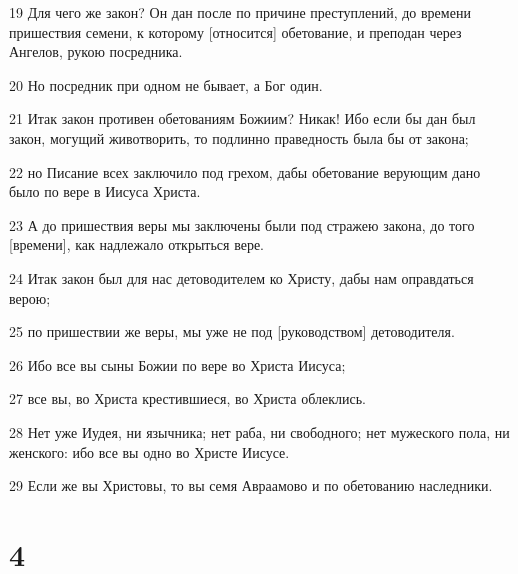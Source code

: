 \par 19 Для чего же закон? Он дан после по причине преступлений, до времени пришествия семени, к которому [относится] обетование, и преподан через Ангелов, рукою посредника.
\par 20 Но посредник при одном не бывает, а Бог один.
\par 21 Итак закон противен обетованиям Божиим? Никак! Ибо если бы дан был закон, могущий животворить, то подлинно праведность была бы от закона;
\par 22 но Писание всех заключило под грехом, дабы обетование верующим дано было по вере в Иисуса Христа.
\par 23 А до пришествия веры мы заключены были под стражею закона, до того [времени], как надлежало открыться вере.
\par 24 Итак закон был для нас детоводителем ко Христу, дабы нам оправдаться верою;
\par 25 по пришествии же веры, мы уже не под [руководством] детоводителя.
\par 26 Ибо все вы сыны Божии по вере во Христа Иисуса;
\par 27 все вы, во Христа крестившиеся, во Христа облеклись.
\par 28 Нет уже Иудея, ни язычника; нет раба, ни свободного; нет мужеского пола, ни женского: ибо все вы одно во Христе Иисусе.
\par 29 Если же вы Христовы, то вы семя Авраамово и по обетованию наследники.

\chapter{4}

